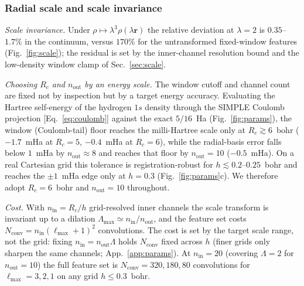 \documentclass[aps,prb,reprint,superscriptaddress,nofootinbib]{revtex4-2}
\newcommand{\rr}{\mathbf{r}}
\newcommand{\Rc}{R_{c}}
\newcommand{\nin}{n_{\mathrm{in}}}
\newcommand{\nout}{n_{\mathrm{out}}}
\begin{document}
\subsubsection{Radial scale and scale invariance}
\label{sec:results-scale}

\emph{Scale invariance.} Under $\rho\mapsto\lambda^3\rho(\lambda\rr)$ the relative
deviation at $\lambda=2$ is $0.35$--$1.7\%$ in the continuum, versus $170\%$ for the
untransformed fixed-window features (Fig.~\ref{fig:scale}); the residual is set by
the inner-channel resolution bound and the low-density window clamp of
Sec.~\ref{sec:scale}.

\emph{Choosing $\Rc$ and $\nout$ by an energy scale.} The window cutoff and channel
count are fixed not by inspection but by a target energy accuracy. Evaluating the
Hartree self-energy of the hydrogen $1s$ density through the SIMPLE Coulomb projection
[Eq.~\eqref{eq:coulomb}] against the exact $5/16$~Ha (Fig.~\ref{fig:params}), the
window (Coulomb-tail) floor reaches the milli-Hartree scale only at $\Rc\gtrsim6$~bohr
($-1.7$~mHa at $\Rc=5$, $-0.4$~mHa at $\Rc=6$), while the radial-basis error falls
below $1$~mHa by $\nout\approx8$ and reaches that floor by $\nout=10$ ($-0.5$~mHa).
On a real Cartesian grid this tolerance is registration-robust for
$h\lesssim0.2$--$0.25$~bohr and reaches the $\pm1$~mHa edge only at $h=0.3$
(Fig.~\ref{fig:params}c). We therefore adopt $\Rc=6$~bohr and $\nout=10$ throughout.

\emph{Cost.} With $\nin=\Rc/h$ grid-resolved inner channels the scale transform is
invariant up to a dilation $\Lambda_{\max}\simeq\nin/\nout$, and the feature set costs
$N_{\mathrm{conv}}=\nin(\ell_{\max}+1)^2$ convolutions. The cost is set by the target
scale range, not the grid: fixing $\nin=\nout\Lambda$ holds $N_{\mathrm{conv}}$ fixed
across $h$ (finer grids only sharpen the same channels; App.~\ref{app:params}). At
$\nin=20$ (covering $\Lambda=2$ for $\nout=10$) the full feature set is
$N_{\mathrm{conv}}=320,180,80$ convolutions for $\ell_{\max}=3,2,1$ on any grid
$h\le0.3$~bohr.
\end{document}
